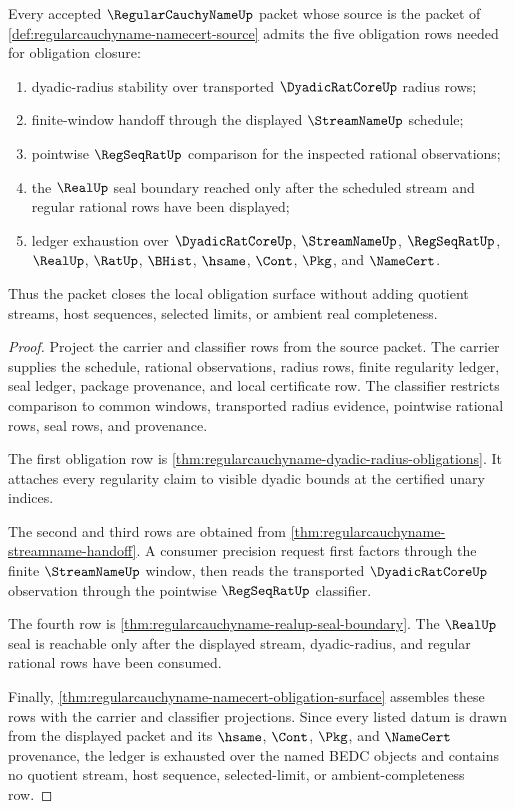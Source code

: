 \begin{theorem}
\label{thm:regularcauchyname-obligation-closure-package}
Every accepted $\RegularCauchyNameUp$ packet whose source is the packet of \autoref{def:regularcauchyname-namecert-source} admits the five obligation rows needed for obligation closure:
\begin{enumerate}
\item dyadic-radius stability over transported $\DyadicRatCoreUp$ radius rows;
\item finite-window handoff through the displayed $\StreamNameUp$ schedule;
\item pointwise $\RegSeqRatUp$ comparison for the inspected rational observations;
\item the $\RealUp$ seal boundary reached only after the scheduled stream and regular rational rows have been displayed;
\item ledger exhaustion over $\DyadicRatCoreUp$, $\StreamNameUp$, $\RegSeqRatUp$, $\RealUp$, $\RatUp$, $\BHist$, $\hsame$, $\Cont$, $\Pkg$, and $\NameCert$.
\end{enumerate}
Thus the packet closes the local obligation surface without adding quotient streams, host sequences, selected limits, or ambient real completeness.
\end{theorem}
\begin{proof}
Project the carrier and classifier rows from the source packet. The carrier supplies the schedule, rational observations, radius rows, finite regularity ledger, seal ledger, package provenance, and local certificate row. The classifier restricts comparison to common windows, transported radius evidence, pointwise rational rows, seal rows, and provenance.

The first obligation row is \autoref{thm:regularcauchyname-dyadic-radius-obligations}. It attaches every regularity claim to visible dyadic bounds at the certified unary indices.

The second and third rows are obtained from \autoref{thm:regularcauchyname-streamname-handoff}. A consumer precision request first factors through the finite $\StreamNameUp$ window, then reads the transported $\DyadicRatCoreUp$ observation through the pointwise $\RegSeqRatUp$ classifier.

The fourth row is \autoref{thm:regularcauchyname-realup-seal-boundary}. The $\RealUp$ seal is reachable only after the displayed stream, dyadic-radius, and regular rational rows have been consumed.

Finally, \autoref{thm:regularcauchyname-namecert-obligation-surface} assembles these rows with the carrier and classifier projections. Since every listed datum is drawn from the displayed packet and its $\hsame$, $\Cont$, $\Pkg$, and $\NameCert$ provenance, the ledger is exhausted over the named BEDC objects and contains no quotient stream, host sequence, selected-limit, or ambient-completeness row.
\end{proof}

